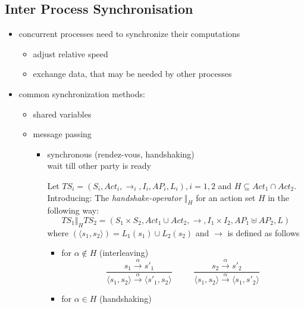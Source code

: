 \documentclass[a4paper, 10pt]{article}
\begin{document}
\subsection*{Inter Process Synchronisation}
\begin{itemize}
    \item concurrent processes need to synchronize their computations
    \begin{itemize}
        \item adjust relative speed
        \item exchange data, that may be needed by other processes
    \end{itemize}
    \item common synchronization methods:
    \begin{itemize}
        \item shared variables
        \item message passing
        \begin{itemize}
            \item synchronous (rendez-vous, handshaking) \\
            wait till other party is ready
            \begin{shaded}
                Let $TS_i=(S_i,Act_i,\longrightarrow_i,I_i,AP_i,L_i), i=1,2$ and $H\subseteq Act_1\cap Act_2$. \\
                Introducing: The \emph{handshake-operator} $\Vert_H$ for an action set $H$ in the following way:
                \[ TS_1 \Vert_H TS_2 = (S_1\times S_2,Act_1\cup Act_2,\longrightarrow,I_1\times I_2, AP_1 \uplus AP_2,L) \]
                where $(\langle s_1,s_2\rangle) = L_1(s_1)\cup L_2(s_2)$ and $\longrightarrow$ is defined as follows
                \begin{itemize}
                    \item for $\alpha\not\in H$ (interleaving)
                    \[
                    \frac{
                    s_1 \overset{\alpha}{\longrightarrow} s'_1
                    }{
                    \langle s_1,s_2 \rangle \overset{\alpha}{\longrightarrow} \langle s'_1,s_2 \rangle
                    }
                    \phantom{\textrm{ and ·}}
                    \frac{
                    s_2 \overset{\alpha}{\longrightarrow} s'_2
                    }{
                    \langle s_1,s_2 \rangle \overset{\alpha}{\longrightarrow} \langle s_1,s'_2 \rangle
                    }
                    \]
                    \item for $\alpha\in H$ (handshaking)

\end{itemize}
\end{shaded}
\end{itemize}
\end{itemize}
\end{itemize}
\end{document}

